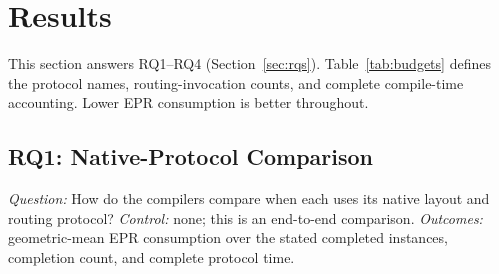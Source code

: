 \section{Results}
\label{sec:results}

This section answers RQ1--RQ4 (Section~\ref{sec:rqs}).
Table~\ref{tab:budgets} defines the protocol names, routing-invocation
counts, and complete compile-time accounting. Lower EPR consumption is
better throughout.

\subsection{RQ1: Native-Protocol Comparison}
\label{sec:rq1}
\label{sec:main_results}

\emph{Question:} How do the compilers compare when each uses its native
layout and routing protocol? \emph{Control:} none; this is an end-to-end
comparison. \emph{Outcomes:} geometric-mean EPR consumption over the stated
completed instances, completion count, and complete protocol time.

